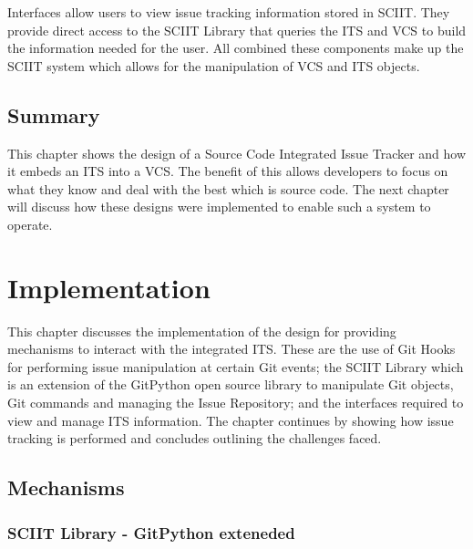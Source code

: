 \documentclass{mproj}
\begin{document}
Interfaces allow users to view issue tracking information stored in SCIIT. They provide direct access to the SCIIT Library that queries the ITS and VCS to build the information needed for the user. All combined these components make up the SCIIT system which allows for the manipulation of VCS and ITS objects.





\section{Summary}

This chapter shows the design of a Source Code Integrated Issue Tracker and how it embeds an ITS into a VCS. The benefit of this allows developers to focus on what they know and deal with the best which is source code. The next chapter will discuss how these designs were implemented to enable such a system to operate.









\chapter{Implementation}\label{implementation}

This chapter discusses the implementation of the design for providing mechanisms to interact with the integrated ITS. These are the use of Git Hooks for performing issue manipulation at certain Git events; the SCIIT Library which is an extension of the GitPython open source library to manipulate Git objects, Git commands and managing the Issue Repository; and the interfaces required to view and manage ITS information. The chapter continues by showing how issue tracking is performed and concludes outlining the challenges faced.

\section{Mechanisms}

\subsection{SCIIT Library - GitPython exteneded}
\end{document}

